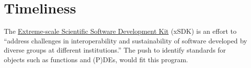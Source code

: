 \documentclass{amsart}
\begin{document}
\section{Timeliness} %

The \href{https://xsdk.info}{Extreme-scale Scientific Software Development Kit} (xSDK) is an effort to ``address challenges in interoperability and sustainability of software developed by diverse groups at different institutions.'' The push to identify standards for objects such as functions and (P)DEs, would fit this program.

\printbibliography
%
%

\vspace{-1ex}

\end{document}
